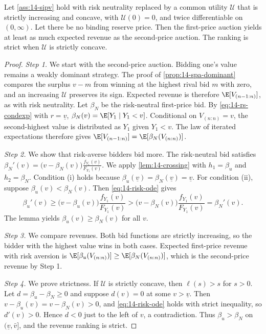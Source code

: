 \begin{proposition}\label{prop:14-risk-fpa}
Let \cref{ass:14-sipv} hold with risk neutrality replaced by a common utility $\mathcal U$ that is strictly increasing and concave, with $\mathcal U(0)=0$, and twice differentiable on $(0,\infty)$. Let there be no binding reserve price. Then the first-price auction yields at least as much expected revenue as the second-price auction. The ranking is strict when $\mathcal U$ is strictly concave.
\end{proposition}

\begin{proof}
\emph{Step 1.} We start with the second-price auction. Bidding one's value remains a weakly dominant strategy. The proof of \cref{prop:14-spa-dominant} compares the surplus $v-m$ from winning at the highest rival bid $m$ with zero, and an increasing $\mathcal U$ preserves its sign. Expected revenue is therefore $\E[V_{(n-1:n)}]$, as with risk neutrality. Let $\beta_N$ be the risk-neutral first-price bid. By \eqref{eq:14-rs-condexp} with $r=\underline v$, $\beta_N(v)=\E[Y_1\mid Y_1<v]$. Conditional on $V_{(n:n)}=v$, the second-highest value is distributed as $Y_1$ given $Y_1<v$. The law of iterated expectations therefore gives $\E[V_{(n-1:n)}]=\E[\beta_N(V_{(n:n)})]$.

\emph{Step 2.} We show that risk-averse bidders bid more. The risk-neutral bid satisfies $\beta_N'(v)=\big(v-\beta_N(v)\big)\frac{f_{Y_1}(v)}{F_{Y_1}(v)}$. We apply \cref{lem:14-crossing} with $h_1=\beta_u$ and $h_2=\beta_N$. Condition (i) holds because $\beta_u(\underline v)=\beta_N(\underline v)=\underline v$. For condition (ii), suppose $\beta_u(v)<\beta_N(v)$. Then \eqref{eq:14-risk-ode} gives
\[
\beta_u'(v)\ge\big(v-\beta_u(v)\big)\frac{f_{Y_1}(v)}{F_{Y_1}(v)}>\big(v-\beta_N(v)\big)\frac{f_{Y_1}(v)}{F_{Y_1}(v)}=\beta_N'(v).
\]
The lemma yields $\beta_u(v)\ge\beta_N(v)$ for all $v$.

\emph{Step 3.} We compare revenues. Both bid functions are strictly increasing, so the bidder with the highest value wins in both cases. Expected first-price revenue with risk aversion is $\E[\beta_u(V_{(n:n)})]\ge\E[\beta_N(V_{(n:n)})]$, which is the second-price revenue by Step 1.

\emph{Step 4.} We prove strictness. If $\mathcal U$ is strictly concave, then $\ell(s)>s$ for $s>0$. Let $d=\beta_u-\beta_N\ge 0$ and suppose $d(v)=0$ at some $v>\underline v$. Then $v-\beta_u(v)=v-\beta_N(v)>0$, and \eqref{eq:14-risk-ode} holds with strict inequality, so $d'(v)>0$. Hence $d<0$ just to the left of $v$, a contradiction. Thus $\beta_u>\beta_N$ on $(\underline v,\bar v]$, and the revenue ranking is strict.
\end{proof}

